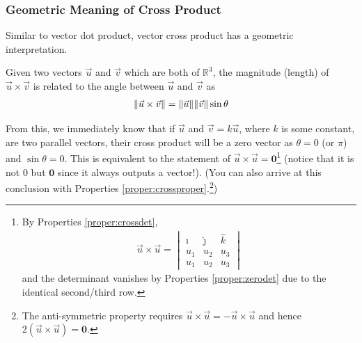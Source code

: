 \subsubsection{Geometric Meaning of Cross Product} Similar to vector dot product, vector cross product has a geometric interpretation.
\begin{proper}
\label{proper:crossgeo}
Given two vectors $\vec{u}$ and $\vec{v}$ which are both of $\mathbb{R}^3$, the magnitude (length) of $\vec{u} \times \vec{v}$ is related to the angle between $\vec{u}$ and $\vec{v}$ as
\begin{align}
\norm{\vec{u} \times \vec{v}} = \norm{\vec{u}}\norm{\vec{v}}\sin\theta \label{eqn:crossgeo}
\end{align}
\end{proper}
From this, we immediately know that if $\vec{u}$ and $\vec{v} = k\vec{u}$, where $k$ is some constant, are two parallel vectors, their cross product will be a zero vector as $\theta = 0$ (or $\pi$) and $\sin \theta = 0$. This is equivalent to the statement of $\vec{u} \times \vec{u} = \textbf{0}$\footnote{By Properties \ref{proper:crossdet},
\begin{align*}
\vec{u} \times \vec{u} = 
\begin{vmatrix}
\hat{\imath} & \hat{\jmath} & \hat{k} \\
u_1 & u_2 & u_3 \\
u_1 & u_2 & u_3
\end{vmatrix} 
\end{align*} and the determinant vanishes by Properties \ref{proper:zerodet} due to the identical second/third row.} (notice that it is not $0$ but $\textbf{0}$ since it always outputs a vector!). (You can also arrive at this conclusion with Properties \ref{proper:crossproper}.\footnote{The anti-symmetric property requires $\vec{u}\times\vec{u} = -\vec{u}\times\vec{u}$ and hence $2(\vec{u}\times\vec{u}) = \textbf{0}$.})

